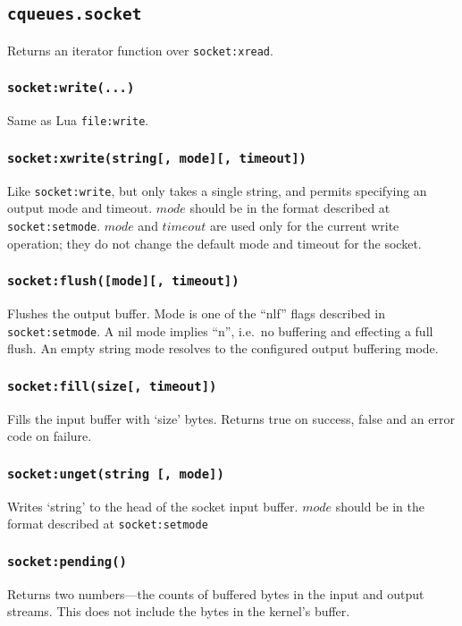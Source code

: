\documentclass[11pt, oneside]{memoir}
\newcommand*{\fn}[1]{\texttt{#1}\xspace}
\newcommand*{\method}[1]{\texttt{#1}\xspace}
\newcounter{toccols}
\newenvironment{Module}[1]{
	\subsection{\texttt{#1}}
	\addtocontents{toc}{
		\protect\begin{multicols}{\value{toccols}}
	}
}{
	\addtocontents{toc}{\protect\end{multicols}}
}
\begin{document}
\begin{Module}{cqueues.socket}
Returns an iterator function over \method{socket:xread}.

\subsubsection[\fn{socket:write}]{\fn{socket:write(...)}}
Same as Lua \fn{file:write}.

\subsubsection[\fn{socket:xwrite}]{\fn{socket:xwrite(string[, mode][, timeout])}}

Like \method{socket:write}, but only takes a single string, and permits specifying an output mode and timeout. $mode$ should be in the format described at \method{socket:setmode}. $mode$ and $timeout$ are used only for the current write operation; they do not change the default mode and timeout for the socket.

\subsubsection[\fn{socket:flush}]{\fn{socket:flush([mode][, timeout])}}
Flushes the output buffer. Mode is one of the ``nlf'' flags described in \method{socket:setmode}. A nil mode implies ``n'', i.e.\ no buffering and effecting a full flush. An empty string mode resolves to the configured output buffering mode.

\subsubsection[\fn{socket:fill}]{\fn{socket:fill(size[, timeout])}}
Fills the input buffer with `size' bytes. Returns true on success, false and an error code on failure.

\subsubsection[{\fn{socket:unget}}]{\fn{socket:unget(string [, mode])}}
Writes `string' to the head of the socket input buffer.
$mode$ should be in the format described at \method{socket:setmode}

\subsubsection[{\fn{socket:pending}}]{\fn{socket:pending()}}
Returns two numbers---the counts of buffered bytes in the input and output streams. This does not include the bytes in the kernel's buffer.


\end{Module}
\end{document}

